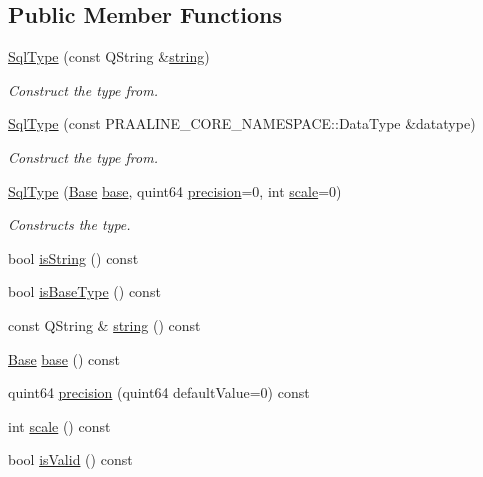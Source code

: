 \subsection*{Public Member Functions}
\begin{DoxyCompactItemize}
\item 
\hyperlink{class_q_sql_migrator_1_1_structure_1_1_sql_type_af83707a053e7fd46ab395d45b78b587d}{Sql\+Type} (const Q\+String \&\hyperlink{class_q_sql_migrator_1_1_structure_1_1_sql_type_a440825279083be8b5f15f2a5ddcf2e30}{string})
\begin{DoxyCompactList}\small\item\em Construct the type from. \end{DoxyCompactList}\item 
\hyperlink{class_q_sql_migrator_1_1_structure_1_1_sql_type_aeb468b0e5dd0bd47efe88f4d75ab3029}{Sql\+Type} (const P\+R\+A\+A\+L\+I\+N\+E\+\_\+\+C\+O\+R\+E\+\_\+\+N\+A\+M\+E\+S\+P\+A\+C\+E\+::\+Data\+Type \&datatype)
\begin{DoxyCompactList}\small\item\em Construct the type from. \end{DoxyCompactList}\item 
\hyperlink{class_q_sql_migrator_1_1_structure_1_1_sql_type_a025fddf53697e4ae4dc6f01be8d69395}{Sql\+Type} (\hyperlink{class_q_sql_migrator_1_1_structure_1_1_sql_type_ac1733fcbed79941acd89bcf3196d9912}{Base} \hyperlink{class_q_sql_migrator_1_1_structure_1_1_sql_type_ab4a603f82ba6b21fac815758bc2a62ed}{base}, quint64 \hyperlink{class_q_sql_migrator_1_1_structure_1_1_sql_type_a045dc033e0ce8ecaddc394ce6de1ae11}{precision}=0, int \hyperlink{class_q_sql_migrator_1_1_structure_1_1_sql_type_ab4b716a0b8f90bf4ac04d4d01bb087fe}{scale}=0)
\begin{DoxyCompactList}\small\item\em Constructs the type. \end{DoxyCompactList}\item 
bool \hyperlink{class_q_sql_migrator_1_1_structure_1_1_sql_type_ac615ae6908ecf48f55486a4746c26ce3}{is\+String} () const
\item 
bool \hyperlink{class_q_sql_migrator_1_1_structure_1_1_sql_type_a54c409ad114a2951e4fd11cea266bc66}{is\+Base\+Type} () const
\item 
const Q\+String \& \hyperlink{class_q_sql_migrator_1_1_structure_1_1_sql_type_a440825279083be8b5f15f2a5ddcf2e30}{string} () const
\item 
\hyperlink{class_q_sql_migrator_1_1_structure_1_1_sql_type_ac1733fcbed79941acd89bcf3196d9912}{Base} \hyperlink{class_q_sql_migrator_1_1_structure_1_1_sql_type_ab4a603f82ba6b21fac815758bc2a62ed}{base} () const
\item 
quint64 \hyperlink{class_q_sql_migrator_1_1_structure_1_1_sql_type_a045dc033e0ce8ecaddc394ce6de1ae11}{precision} (quint64 default\+Value=0) const
\item 
int \hyperlink{class_q_sql_migrator_1_1_structure_1_1_sql_type_ab4b716a0b8f90bf4ac04d4d01bb087fe}{scale} () const
\item 
bool \hyperlink{class_q_sql_migrator_1_1_structure_1_1_sql_type_a51e3974a6b29b47dee30e7597aa3a08b}{is\+Valid} () const
\end{DoxyCompactItemize}
